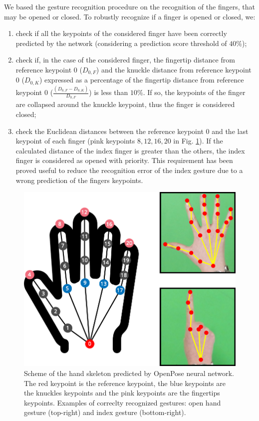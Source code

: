 \documentclass[letterpaper, 10 pt, conference]{ieeeconf}  %
\begin{document}
We based the gesture recognition procedure on the recognition of the fingers, that may be opened or closed. To robustly recognize if a finger is opened or closed, we:
\begin{enumerate}
\item check if all the keypoints of the considered finger have been correctly predicted by the network (considering a prediction score threshold of $40\%$);
\item check if, in the case of the considered finger, the fingertip distance from reference keypoint $0$ ($D_{0,F}$) and the knuckle distance from reference keypoint $0$ ($D_{0,K}$) expressed as a percentage of the fingertip distance from reference keypoint $0$ ($\frac{(D_{0,F} - D_{0,K})}{D_{0,F}}$) is less than $10\%$. If so, the keypoints of the finger are collapsed around the knuckle keypoint, thus the finger is considered closed;
\item check the Euclidean distances between the reference keypoint $0$ and the last keypoint of each finger (pink keypoints $8, 12, 16, 20$ in Fig. \ref{fig:keypoints}). If the calculated distance of the index finger is greater than the others, the index finger is considered as opened with priority. This requirement has been proved useful to reduce the recognition error of the index gesture due to a wrong prediction of the fingers keypoints.
\end{enumerate}

\begin{figure} [h!]
  \centering
  \includegraphics[width=1\columnwidth]{figures/keypoints.png}
  \caption{Scheme of the hand skeleton predicted by OpenPose neural network. The red keypoint is the reference keypoint, the blue keypoints are the knuckles keypoints and the pink keypoints are the fingertips keypoints. Examples of correclty recognized gestures: open hand gesture (top-right) and index gesture (bottom-right).}
  \label{fig:keypoints}
\end{figure}
\end{document}
